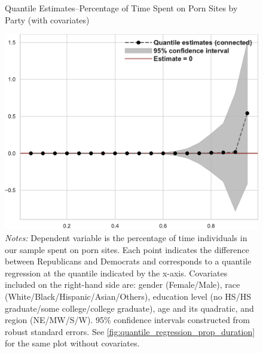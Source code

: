 \documentclass[12pt, letterpaper]{article}
\begin{document}
\begin{figure}[ht]
	\centering
	\caption{Quantile Estimates--Percentage of Time Spent on Porn Sites by Party (with covariates)}
	\includegraphics[width=.55\linewidth]{../figs/quantile_reg_covariates_proportion_duration_adult.pdf}
	\caption*{\footnotesize \emph{Notes:} 
		Dependent variable is the percentage of time individuals in our sample spent on porn sites.
		Each point indicates the difference between Republicans and Democrats and corresponds to a quantile regression at the quantile indicated by the x-axis.
		Covariates included on the right-hand side are: gender (Female/Male), race (White/Black/Hispanic/Asian/Others), education level (no HS/HS graduate/some college/college graduate), age and its quadratic, and region (NE/MW/S/W).
		95\% confidence intervals constructed from robust standard errors.
		See \cref{fig:quantile_regression_prop_duration} for the same plot without covariates.
	}
	\label{fig:quantile_regression_prop_duration_covariates}
\end{figure}
\end{document}
